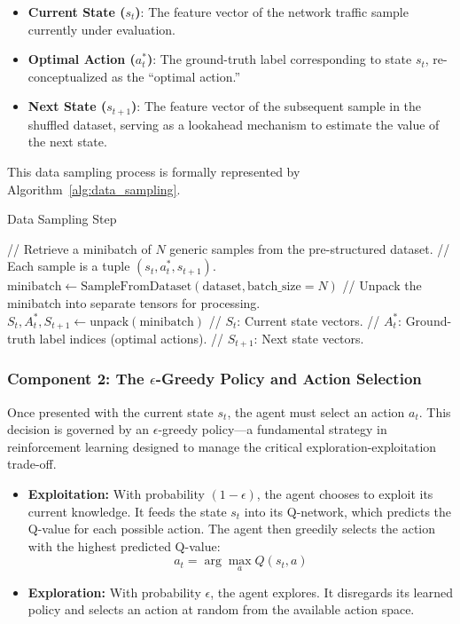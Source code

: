 \documentclass{report}
\begin{document}
\begin{itemize}
  \item \textbf{Current State (\( s_t \))}: The feature vector of the network traffic sample currently under evaluation.
  \item \textbf{Optimal Action (\( a^*_t \))}: The ground-truth label corresponding to state \( s_t \), re-conceptualized as the “optimal action.”
  \item \textbf{Next State (\( s_{t+1} \))}: The feature vector of the subsequent sample in the shuffled dataset, serving as a lookahead mechanism to estimate the value of the next state.
\end{itemize}

This data sampling process is formally represented by Algorithm~\ref{alg:data_sampling}.

\begin{algorithm}[H]
\caption{Data Sampling Step}
\label{alg:data_sampling}
\begin{algorithmic}[1]
\State // Retrieve a minibatch of \( N \) generic samples from the pre-structured dataset.
\State // Each sample is a tuple \( (s_t, a^*_t, s_{t+1}) \).
\State \( \text{minibatch} \gets \text{SampleFromDataset}(\text{dataset}, \text{batch\_size} = N) \)
\State // Unpack the minibatch into separate tensors for processing.
\State \( S_t, A^*_t, S_{t+1} \gets \text{unpack}(\text{minibatch}) \)
\State // \( S_t \): Current state vectors.
\State // \( A^*_t \): Ground-truth label indices (optimal actions).
\State // \( S_{t+1} \): Next state vectors.
\end{algorithmic}
\end{algorithm}

\subsubsection*{Component 2: The $\epsilon$-Greedy Policy and Action Selection}

Once presented with the current state $s_t$, the agent must select an action $a_t$. This decision is governed by an $\epsilon$-greedy policy—a fundamental strategy in reinforcement learning designed to manage the critical exploration-exploitation trade-off.

\begin{itemize}
    \item \textbf{Exploitation:} With probability $(1 - \epsilon)$, the agent chooses to exploit its current knowledge. It feeds the state $s_t$ into its Q-network, which predicts the Q-value for each possible action. The agent then greedily selects the action with the highest predicted Q-value: 
    \[
    a_t = \arg\max_a Q(s_t, a)
    \]
    
    \item \textbf{Exploration:} With probability $\epsilon$, the agent explores. It disregards its learned policy and selects an action at random from the available action space.
\end{itemize}
\end{document}
